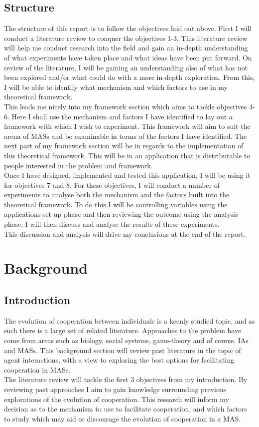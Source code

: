 \documentclass[]{final_report}
\begin{document}
\section{Structure}
The structure of this report is to follow the objectives laid out above. First I will conduct a literature review to conquer the objectives 1-3. This literature review will help me conduct research into the field and gain an in-depth understanding of what experiments have taken place and what ideas have been put forward. On review of the literature, I will be gaining an understanding also of what has not been explored and/or what could do with a more in-depth exploration. From this, I will be able to identify what mechanism and which factors to use in my theoretical framework.\\
This leads me nicely into my framework section which aims to tackle objectives 4-6. Here I shall use the mechanism and factors I have identified to lay out a framework with which I wish to experiment. This framework will aim to suit the arena of MASs and be examinable in terms of the factors I have identified. The next part of my framework section will be in regards to the implementation of this theoretical framework. This will be in an application that is distributable to people interested in the problem and framework.\\
Once I have designed, implemented and tested this application, I will be using it for objectives 7 and 8. For these objectives, I will conduct a number of experiments to analyse both the mechanism and the factors built into the theoretical framework. To do this I will be controlling variables using the applications set up phase and then reviewing the outcome using the analysis phase. I will then discuss and analyse the results of these experiments.\\
This discussion and analysis will drive my conclusions at the end of the report.


\chapter{Background}
\label{chap:background}
\section{Introduction}
The evolution of cooperation between individuals is a keenly studied topic, and as such there is a large set of related literature. Approaches to the problem have come from areas such as biology, social systems, game-theory and of course, IAs and MASs. This background section will review past literature in the topic of agent interactions, with a view to exploring the best options for facilitating cooperation in MASs.\\
The literature review will tackle the first 3 objectives from my introduction. By reviewing past approaches I aim to gain knowledge surrounding previous explorations of the evolution of cooperation. This research will inform my decision as to the mechanism to use to facilitate cooperation, and which factors to study which may aid or discourage the evolution of cooperation in a MAS.
\end{document}
